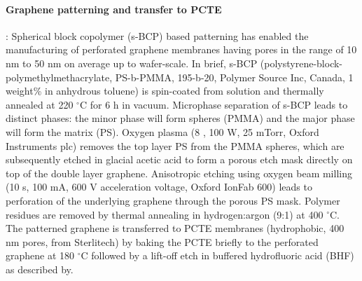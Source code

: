 \paragraph{Graphene patterning and transfer to PCTE}: Spherical block
copolymer (s-BCP) based patterning has enabled the manufacturing of
perforated graphene membranes having pores in the range of 10 nm to 50
nm on average up to wafer-scale\autocite{Choi_2018_wafer_scale_gr}. In
brief, s-BCP (polystyrene-block-polymethylmethacrylate, PS-b-PMMA,
195-b-20, Polymer Source Inc, Canada, 1 weight\% in anhydrous toluene)
is spin-coated from solution and thermally annealed at 220 $^{\circ}$C
for 6 h in vacuum. Microphase separation of s-BCP leads to distinct
phases: the minor phase will form spheres (PMMA) and the major phase
will form the matrix (PS). Oxygen plasma (8 , 100 W, 25 mTorr, Oxford
Instruments plc) removes the top layer PS from the PMMA spheres, which
are subsequently etched in glacial acetic acid to form a porous etch
mask directly on top of the double layer graphene. Anisotropic etching
using oxygen beam milling (10 s, 100 mA, 600 V acceleration voltage,
Oxford IonFab 600) leads to perforation of the underlying graphene
through the porous PS mask. Polymer residues are removed by thermal
annealing in hydrogen:argon (9:1) at 400 $^{\circ}$C. The patterned
graphene is transferred to PCTE membranes (hydrophobic, 400 nm pores,
from Sterlitech) by baking the PCTE briefly to the perforated graphene
at 180 $^{\circ}$C followed by a lift-off etch in buffered
hydrofluoric acid (BHF) as described
by\autocite{Choi_2018_wafer_scale_gr}.

\vspace{1em}
\noindent
